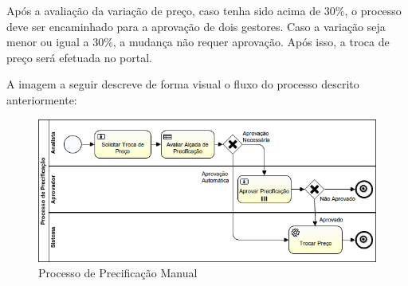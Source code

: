 Após a avaliação da variação de preço, caso tenha sido acima de 30\%, o processo deve ser encaminhado para a aprovação de dois gestores. Caso a variação seja menor ou igual a 30\%, a mudança não requer aprovação. Após isso, a troca de preço será efetuada no portal.

A imagem a seguir descreve de forma visual o fluxo do processo descrito anteriormente:

\begin{figure}[H]
  \centering
  \includegraphics[width=1.0\textwidth]{imagens/ProcessoDePrecificacao.png}
  \caption{Processo de Precificação Manual}
  \label{fig:exemplo_bpmn}
\end{figure}